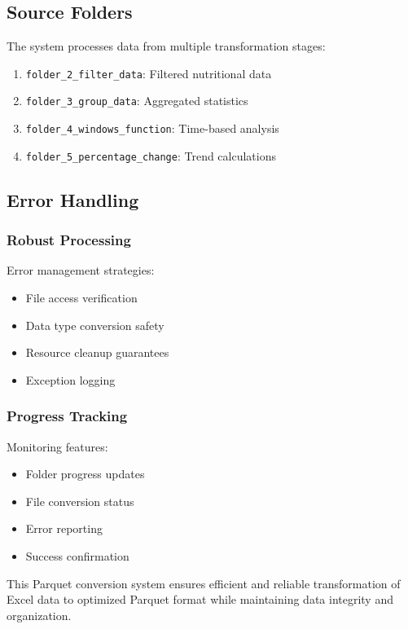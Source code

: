 \subsection{Source Folders}
The system processes data from multiple transformation stages:
\begin{enumerate}
    \item \texttt{folder\_2\_filter\_data}: Filtered nutritional data
    \item \texttt{folder\_3\_group\_data}: Aggregated statistics
    \item \texttt{folder\_4\_windows\_function}: Time-based analysis
    \item \texttt{folder\_5\_percentage\_change}: Trend calculations
\end{enumerate}

\subsection{Error Handling}

\subsubsection{Robust Processing}
Error management strategies:
\begin{itemize}
    \item File access verification
    \item Data type conversion safety
    \item Resource cleanup guarantees
    \item Exception logging
\end{itemize}

\subsubsection{Progress Tracking}
Monitoring features:
\begin{itemize}
    \item Folder progress updates
    \item File conversion status
    \item Error reporting
    \item Success confirmation
\end{itemize}

This Parquet conversion system ensures efficient and reliable transformation of Excel data to optimized Parquet format while maintaining data integrity and organization.
